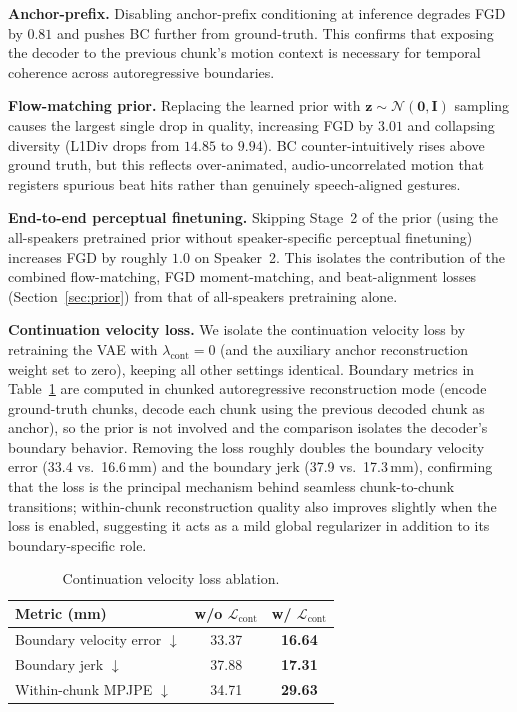 \noindent \textbf{Anchor-prefix.}
Disabling anchor-prefix conditioning at inference degrades FGD by $0.81$ and pushes BC further from ground-truth.
This confirms that exposing the decoder to the previous chunk's motion context is necessary for temporal coherence across autoregressive boundaries.

\noindent \textbf{Flow-matching prior.}
Replacing the learned prior with $\mathbf{z} \!\sim\! \mathcal{N}(\mathbf{0}, \mathbf{I})$ sampling causes the largest single drop in quality, increasing FGD by $3.01$ and collapsing diversity (L1Div drops from $14.85$ to $9.94$).
BC counter-intuitively rises above ground truth, but this reflects over-animated, audio-uncorrelated motion that registers spurious beat hits rather than genuinely speech-aligned gestures.

\noindent \textbf{End-to-end perceptual finetuning.}
Skipping Stage~2 of the prior (using the all-speakers pretrained prior without speaker-specific perceptual finetuning) increases FGD by roughly $1.0$ on Speaker~2.
This isolates the contribution of the combined flow-matching, FGD moment-matching, and beat-alignment losses (Section~\ref{sec:prior}) from that of all-speakers pretraining alone.

\noindent \textbf{Continuation velocity loss.}
We isolate the continuation velocity loss by retraining the VAE with $\lambda_\text{cont} \!=\! 0$ (and the auxiliary anchor reconstruction weight set to zero), keeping all other settings identical.
Boundary metrics in Table~\ref{tab:cont_ablation} are computed in chunked autoregressive reconstruction mode (encode ground-truth chunks, decode each chunk using the previous decoded chunk as anchor), so the prior is not involved and the comparison isolates the decoder's boundary behavior.
Removing the loss roughly doubles the boundary velocity error (33.4 vs.~16.6\,mm) and the boundary jerk (37.9 vs.~17.3\,mm), confirming that the loss is the principal mechanism behind seamless chunk-to-chunk transitions; within-chunk reconstruction quality also improves slightly when the loss is enabled, suggesting it acts as a mild global regularizer in addition to its boundary-specific role.

\begin{table}[t]
\scriptsize
\caption{Continuation velocity loss ablation.%
  }
\label{tab:cont_ablation}
\begin{tabular}{lcc}
\toprule
\textbf{Metric (mm)} & \textbf{w/o $\mathcal{L}_\text{cont}$} & \textbf{w/ $\mathcal{L}_\text{cont}$} \\
\midrule
Boundary velocity error $\downarrow$ & 33.37 & \textbf{16.64} \\
Boundary jerk $\downarrow$           & 37.88 & \textbf{17.31} \\
Within-chunk MPJPE $\downarrow$      & 34.71 & \textbf{29.63} \\
\bottomrule
\end{tabular}
\end{table}

